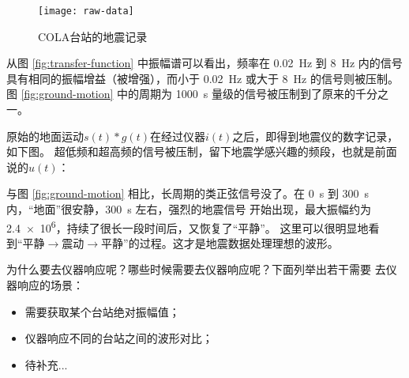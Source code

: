 \begin{figure}[H]
\centering
\texttt{[image: raw-data]}
\caption{COLA台站的地震记录}
\end{figure}

从图 \ref{fig:transfer-function} 中振幅谱可以看出，频率在 \SI{0.02}{\Hz}
到 \SI{8}{\Hz} 内的信号具有相同的振幅增益（被增强），而小于 \SI{0.02}{\Hz}
或大于 \SI{8}{\Hz} 的信号则被压制。图 \ref{fig:ground-motion} 中的周期为
\SI{1000}{\s} 量级的信号被压制到了原来的千分之一。

原始的地面运动$s(t)*g(t)$在经过仪器$i(t)$之后，即得到地震仪的数字记录，如下图。
超低频和超高频的信号被压制，留下地震学感兴趣的频段，也就是前面说的$u(t)$：

与图 \ref{fig:ground-motion} 相比，长周期的类正弦信号没了。在 \SI{0}{\s}
到 \SI{300}{\s} 内，``地面''很安静，\SI{300}{\s} 左右，强烈的地震信号
开始出现，最大振幅约为 \num{2.4e6}，持续了很长一段时间后，又恢复了``平静''。
这里可以很明显地看到``平静$\rightarrow$震动$\rightarrow$平静''的过程。这才是地震数据处理理想的波形。

为什么要去仪器响应呢？哪些时候需要去仪器响应呢？下面列举出若干需要
去仪器响应的场景：
\begin{itemize}
\item 需要获取某个台站绝对振幅值；
\item 仪器响应不同的台站之间的波形对比；
\item 待补充...
\end{itemize}
